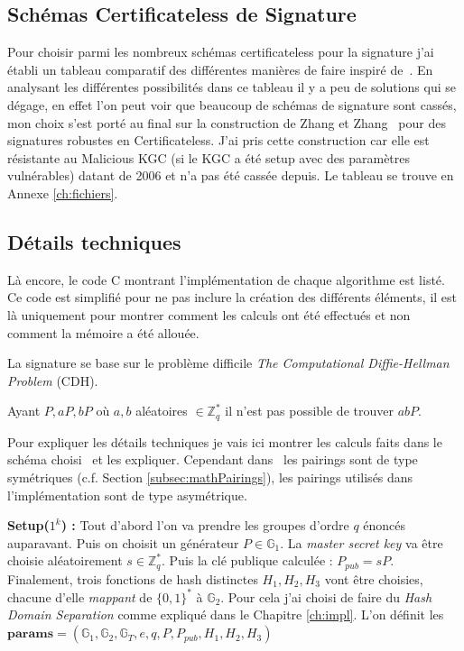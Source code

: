 \subsection{Schémas Certificateless de Signature}
Pour choisir parmi les nombreux schémas certificateless pour la signature j'ai établi un tableau comparatif des différentes manières de faire inspiré de~\cite{bookIntroCertificateless}. En analysant les différentes possibilités dans ce tableau il y a peu de solutions qui se dégage, en effet l'on peut voir que beaucoup de schémas de signature sont cassés, mon choix s'est porté au final sur la construction de Zhang et Zhang~\cite{DBLP:conf/acns/ZhangWXF06} pour des signatures robustes en Certificateless. J'ai pris cette construction car elle est résistante au Malicious KGC (si le KGC a été setup avec des paramètres vulnérables) datant de 2006 et n'a pas été cassée depuis. Le tableau se trouve en Annexe \ref{ch:fichiers}.
\subsection{Détails techniques}
Là encore, le code C montrant l'implémentation de chaque algorithme est listé. Ce code est simplifié pour ne pas inclure la création des différents éléments, il est là uniquement pour montrer comment les calculs ont été effectués et non comment la mémoire a été allouée.
 
La signature se base sur le problème difficile \textit{The Computational Diffie-Hellman Problem} (CDH). 

Ayant $P, aP, bP$ où $a,b$ aléatoires $\in \mathbb{Z}_q^*$ il n'est pas possible de trouver $abP$.

Pour expliquer les détails techniques je vais ici montrer les calculs faits dans le schéma choisi~\cite{DBLP:conf/acns/ZhangWXF06} et les expliquer. Cependant dans~\cite{DBLP:conf/acns/ZhangWXF06} les pairings sont de type symétriques (c.f. Section \ref{subsec:mathPairings}), les pairings utilisés dans l'implémentation sont de type asymétrique.

\textbf{Setup($1^k $) :} Tout d'abord l'on va prendre les groupes d'ordre $q$ énoncés auparavant. Puis on choisit un générateur $P \in \mathbb{G}_1$. La \textit{master secret key} va être choisie aléatoirement $s \in \mathbb{Z}_q^*$. Puis la clé publique calculée : $P_{pub} = sP$. Finalement, trois fonctions de hash distinctes $H_1, H_2, H_3$ vont être choisies, chacune d'elle \textit{mappant} de $\{0,1\}^*$ à $\mathbb{G}_2$. Pour cela j'ai choisi de faire du \textit{Hash Domain Separation} comme expliqué dans le Chapitre \ref{ch:impl}. L'on définit les $\mathbf{params} = (\mathbb{G}_1,\mathbb{G}_2,\mathbb{G}_T,e,q,P,P_{pub},H_1,H_2,H_3)$

